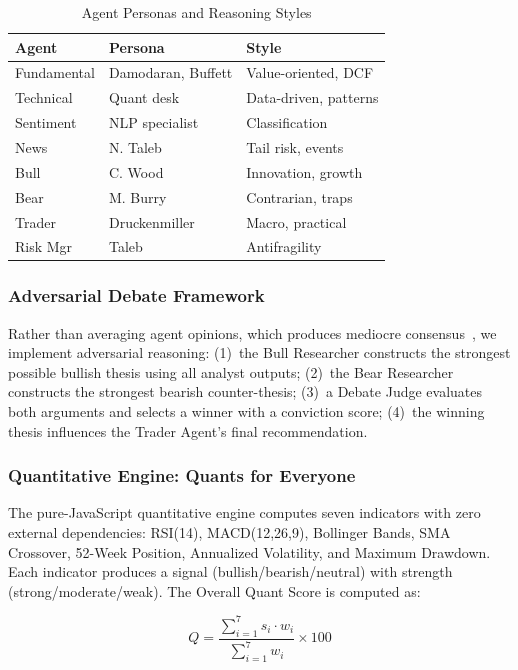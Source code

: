 \documentclass[conference]{IEEEtran}
\begin{document}
\begin{table}[htbp]
\caption{Agent Personas and Reasoning Styles}
\label{tab:personas}
\centering
\small
\begin{tabular}{@{}lll@{}}
\toprule
\textbf{Agent} & \textbf{Persona} & \textbf{Style} \\
\midrule
Fundamental & Damodaran, Buffett & Value-oriented, DCF \\
Technical & Quant desk & Data-driven, patterns \\
Sentiment & NLP specialist & Classification \\
News & N. Taleb & Tail risk, events \\
Bull & C. Wood & Innovation, growth \\
Bear & M. Burry & Contrarian, traps \\
Trader & Druckenmiller & Macro, practical \\
Risk Mgr & Taleb & Antifragility \\
\bottomrule
\end{tabular}
\end{table}

\subsubsection{Adversarial Debate Framework}

Rather than averaging agent opinions, which produces mediocre consensus~\cite{du2023debate}, we implement adversarial reasoning: (1)~the Bull Researcher constructs the strongest possible bullish thesis using all analyst outputs; (2)~the Bear Researcher constructs the strongest bearish counter-thesis; (3)~a Debate Judge evaluates both arguments and selects a winner with a conviction score; (4)~the winning thesis influences the Trader Agent's final recommendation.

\subsubsection{Quantitative Engine: Quants for Everyone}

The pure-JavaScript quantitative engine computes seven indicators with zero external dependencies: RSI(14), MACD(12,26,9), Bollinger Bands, SMA Crossover, 52-Week Position, Annualized Volatility, and Maximum Drawdown. Each indicator produces a signal (bullish/bearish/neutral) with strength (strong/moderate/weak). The Overall Quant Score is computed as:

\begin{equation}
Q = \frac{\sum_{i=1}^{7} s_i \cdot w_i}{\sum_{i=1}^{7} w_i} \times 100
\label{eq:quant_score}
\end{equation}
\end{document}
